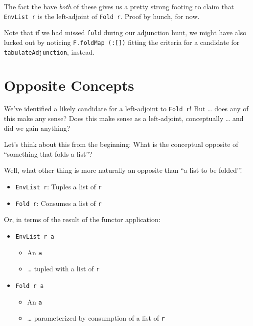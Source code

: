\documentclass[]{article}
\begin{document}
The fact the have \emph{both} of these gives us a pretty strong footing to claim
that \texttt{EnvList\ r} is the left-adjoint of \texttt{Fold\ r}. Proof by
hunch, for now.

Note that if we had missed \texttt{fold} during our adjunction hunt, we might
have also lucked out by noticing \texttt{F.foldMap\ (:{[}{]})} fitting the
criteria for a candidate for \texttt{tabulateAdjunction}, instead.

\hypertarget{opposite-concepts}{%
\section{Opposite Concepts}\label{opposite-concepts}}

We've identified a likely candidate for a left-adjoint to \texttt{Fold\ r}! But
\ldots{} does any of this make any sense? Does this make sense as a
left-adjoint, conceptually \ldots{} and did we gain anything?

Let's think about this from the beginning: What is the conceptual opposite of
``something that folds a list''?

Well, what other thing is more naturally an opposite than ``a list to be
folded''!

\begin{itemize}
\tightlist
\item
  \texttt{EnvList\ r}: Tuples a list of \texttt{r}
\item
  \texttt{Fold\ r}: Consumes a list of \texttt{r}
\end{itemize}

Or, in terms of the result of the functor application:

\begin{itemize}
\tightlist
\item
  \texttt{EnvList\ r\ a}

  \begin{itemize}
  \tightlist
  \item
    An \texttt{a}
  \item
    \ldots{} tupled with a list of \texttt{r}
  \end{itemize}
\item
  \texttt{Fold\ r\ a}

  \begin{itemize}
  \tightlist
  \item
    An \texttt{a}
  \item
    \ldots{} parameterized by consumption of a list of \texttt{r}
  \end{itemize}
\end{itemize}
\end{document}
